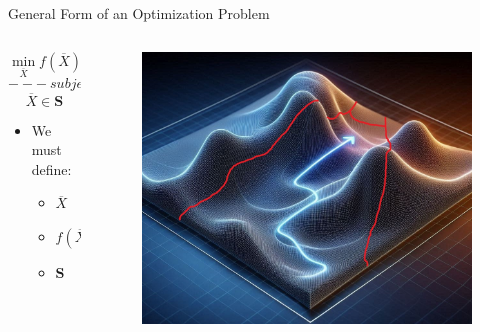 \documentclass[10pt, aspectratio=169]{beamer}
\begin{document}
\begin{frame}{General Form of an Optimization Problem}
    \begin{columns}
        \begin{column}{0.5\textwidth}
            $$\min_{\overline{X}} f(\overline{X})$$
            $$---\ subject\ to\ (s.t.)\ ---$$
            $$\overline{X} \in \textbf{S}$$
            \vspace{1cm}
            \begin{itemize}
                \item We must define:
                \begin{itemize}
                    \item $\overline{X}$
                    \item $f(\overline{X})$
                    \item $\textbf{S}$
                \end{itemize}
            \end{itemize}
        \end{column}
        \begin{column}{0.5\textwidth}
            \begin{figure}
                \includegraphics[width=\linewidth]{MountainWithFences.jpg}
            \end{figure}
        \end{column}
    \end{columns}
\end{frame}
\end{document}
